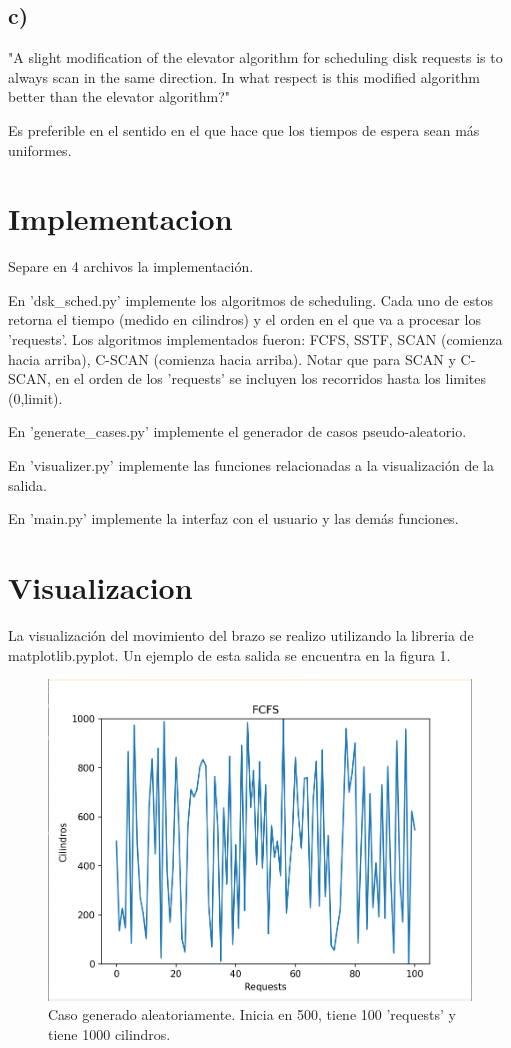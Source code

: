 \documentclass{article}
\theoremstyle{definition}
\begin{document}
\subsection{c)}
	"A slight modification of the elevator algorithm for scheduling
	disk requests is to always scan in the same direction. In what
	respect is this modified algorithm better than the elevator
	algorithm?"
	
	Es preferible en el sentido en el que hace que los tiempos de espera sean más uniformes. 

\section{Implementacion}
	Separe en 4 archivos la implementación.
	
	En 'dsk\_sched.py' implemente los algoritmos de scheduling. Cada uno de estos retorna el tiempo (medido en cilindros) y el orden en el que va a procesar los 'requests'. Los algoritmos implementados fueron: FCFS, SSTF, SCAN (comienza hacia arriba), C-SCAN (comienza hacia arriba). Notar que para SCAN y C-SCAN, en el orden de los 'requests' se incluyen los recorridos hasta los limites (0,limit).
	
	En 'generate\_cases.py' implemente el generador de casos pseudo-aleatorio.
	
	En 'visualizer.py' implemente las funciones relacionadas a la visualización de la salida.
	
	En 'main.py' implemente la interfaz con el usuario y las demás funciones.
	
\section{Visualizacion}
	La visualización del movimiento del brazo se realizo utilizando la libreria de
	matplotlib.pyplot. Un ejemplo de esta salida se encuentra en la figura 1.
	
	\begin{figure}
		\includegraphics[width=1\linewidth]{FCFS_500_100_1000.png}
		\caption{Caso generado aleatoriamente. Inicia en 500, tiene 100 'requests' y tiene 1000 cilindros.}
	\end{figure}
	
\end{document}
